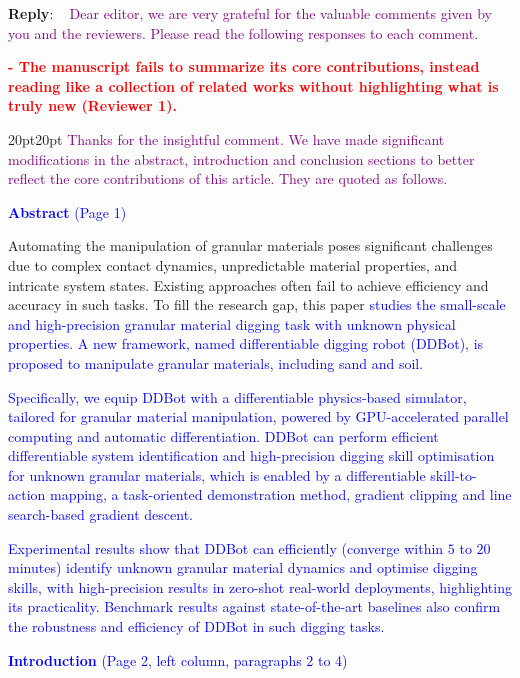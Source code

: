 \documentclass[11pt]{article}
\newcounter{reviewer}
\newenvironment{reply}
   {\medskip \noindent \begin{sf}\textbf{Reply}: \  }
   {\medskip \end{sf}}
\newcommand{\rv}[1]{\textcolor{red}{#1}}
\newcommand{\rp}[1]{\textcolor{purple}{#1}}
\newcommand{\xt}[1]{\textcolor{blue}{#1}}
\begin{document}
\begin{reply}
\rp{Dear editor, we are very grateful for the valuable comments given by you and the reviewers. Please read the following responses to each comment.}

\vspace{0.3cm}\noindent\rv{\textbf{- The manuscript fails to summarize its core contributions, instead reading like a collection of related works without highlighting what is truly new (Reviewer 1).}}

\begin{adjustwidth}{20pt}{20pt}
\noindent\rp{Thanks for the insightful comment. We have made significant modifications in the abstract, introduction and conclusion sections to better reflect the core contributions of this article. They are quoted as follows.}

\vspace{0.3cm}\noindent\xt{\textbf{Abstract} (Page 1)}

Automating the manipulation of granular materials poses significant challenges due to complex contact dynamics, unpredictable material properties, and intricate system states. Existing approaches often fail to achieve efficiency and accuracy in such tasks. To fill the research gap, this paper \xt{studies the small-scale and high-precision granular material digging task with unknown physical properties. A new framework, named differentiable digging robot (DDBot), is proposed to manipulate granular materials, including sand and soil.}

\xt{Specifically, we equip DDBot with a differentiable physics-based simulator, tailored for granular material manipulation, powered by GPU-accelerated parallel computing and automatic differentiation. DDBot can perform efficient differentiable system identification and high-precision digging skill optimisation for unknown granular materials, which is enabled by a differentiable skill-to-action mapping, a task-oriented demonstration method, gradient clipping and line search-based gradient descent.}

\xt{Experimental results show that DDBot can efficiently (converge within $5$ to $20$ minutes) identify unknown granular material dynamics and optimise digging skills, with high-precision results in zero-shot real-world deployments, highlighting its practicality. Benchmark results against state-of-the-art baselines also confirm the robustness and efficiency of DDBot in such digging tasks.}

\vspace{0.3cm}\noindent\xt{\textbf{Introduction} (Page 2, left column, paragraphs 2 to 4)}


\end{adjustwidth}
\end{reply}
\end{document}
